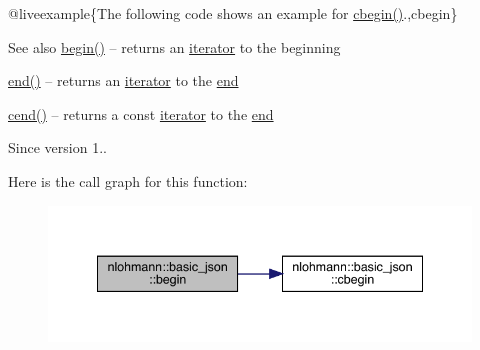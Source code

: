 @liveexample\{The following code shows an example for {\ttfamily \mbox{\hyperlink{classnlohmann_1_1basic__json_ad865d6c291b237ae508d5cb2146b5877}{cbegin()}}}.,cbegin\}

\begin{DoxySeeAlso}{See also}
\mbox{\hyperlink{classnlohmann_1_1basic__json_a0ff28dac23f2bdecee9564d07f51dcdc}{begin()}} -- returns an \mbox{\hyperlink{classnlohmann_1_1basic__json_a099316232c76c034030a38faa6e34dca}{iterator}} to the beginning 

\mbox{\hyperlink{classnlohmann_1_1basic__json_a13e032a02a7fd8a93fdddc2fcbc4763c}{end()}} -- returns an \mbox{\hyperlink{classnlohmann_1_1basic__json_a099316232c76c034030a38faa6e34dca}{iterator}} to the \mbox{\hyperlink{classnlohmann_1_1basic__json_a13e032a02a7fd8a93fdddc2fcbc4763c}{end}} 

\mbox{\hyperlink{classnlohmann_1_1basic__json_a8dba7b7d2f38e6b0c614030aa43983f6}{cend()}} -- returns a const \mbox{\hyperlink{classnlohmann_1_1basic__json_a099316232c76c034030a38faa6e34dca}{iterator}} to the \mbox{\hyperlink{classnlohmann_1_1basic__json_a13e032a02a7fd8a93fdddc2fcbc4763c}{end}}
\end{DoxySeeAlso}
\begin{DoxySince}{Since}
version 1.. 
\end{DoxySince}
Here is the call graph for this function\+:
\nopagebreak
\begin{figure}[H]
\begin{center}
\leavevmode
\includegraphics[width=341pt]{classnlohmann_1_1basic__json_a4f0f5dd42b2987ff20306ed78bd31d1d_cgraph}
\end{center}
\end{figure}
\mbox{\label{classnlohmann_1_1basic__json_ad865d6c291b237ae508d5cb2146b5877}} 
